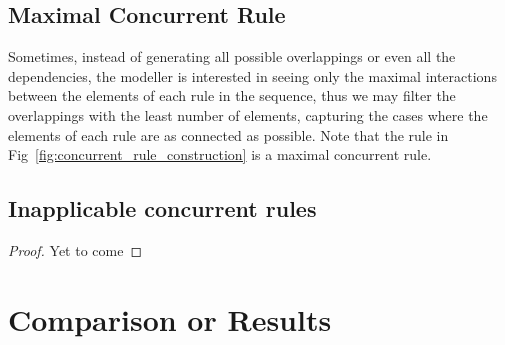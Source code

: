          \subsection{Maximal Concurrent Rule}

          Sometimes, instead of generating all possible overlappings or even all the dependencies, the modeller is interested in seeing only the maximal interactions between the elements of each rule in the sequence, thus we may filter the overlappings with the least number of elements, capturing the cases where the elements of each rule are as connected as possible. Note that the rule in Fig~\ref{fig:concurrent_rule_construction} is a maximal concurrent rule.

\subsection{Inapplicable concurrent rules}

\begin{definition}
\end{definition}

\begin{thm}
  \begin{proof}{Yet to come}
  \end{proof}
\end{thm}

\begin{definition}
\end{definition}

\section{Comparison or Results}
